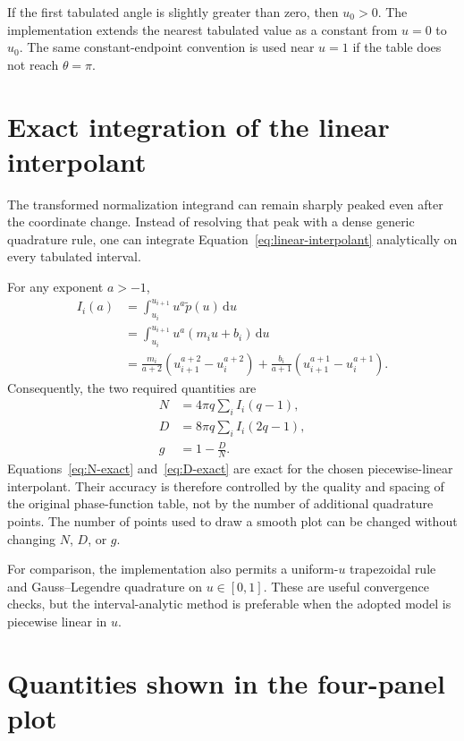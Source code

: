 \documentclass[11pt]{article}
\newcommand{\dd}{\,\mathrm{d}}
\begin{document}
If the first tabulated angle is slightly greater than zero, then $u_0>0$.
The implementation extends the nearest tabulated value as a constant from
$u=0$ to $u_0$.  The same constant-endpoint convention is used near $u=1$ if
the table does not reach $\theta=\pi$.

\section{Exact integration of the linear interpolant}

The transformed normalization integrand can remain sharply peaked even after
the coordinate change.  Instead of resolving that peak with a dense generic
quadrature rule, one can integrate Equation~\eqref{eq:linear-interpolant}
analytically on every tabulated interval.

For any exponent $a>-1$,
\begin{align}
    I_i(a)
    &=\int_{u_i}^{u_{i+1}}u^a\widetilde p(u)\dd u \\
    &=\int_{u_i}^{u_{i+1}}u^a(m_i u+b_i)\dd u \\
    &=\frac{m_i}{a+2}
      \left(u_{i+1}^{a+2}-u_i^{a+2}\right)
      +\frac{b_i}{a+1}
      \left(u_{i+1}^{a+1}-u_i^{a+1}\right).
    \label{eq:interval-integral}
\end{align}
Consequently, the two required quantities are
\begin{align}
    N
    &=4\pi q\sum_i I_i(q-1),
    \label{eq:N-exact}\\
    D
    &=8\pi q\sum_i I_i(2q-1),
    \label{eq:D-exact}\\
    g
    &=1-\frac{D}{N}.
\end{align}
Equations~\eqref{eq:N-exact} and~\eqref{eq:D-exact} are exact for the chosen
piecewise-linear interpolant.  Their accuracy is therefore controlled by the
quality and spacing of the original phase-function table, not by the number of
additional quadrature points.  The number of points used to draw a smooth plot
can be changed without changing $N$, $D$, or $g$.

For comparison, the implementation also permits a uniform-$u$ trapezoidal rule
and Gauss--Legendre quadrature on $u\in[0,1]$.  These are useful convergence
checks, but the interval-analytic method is preferable when the adopted model
is piecewise linear in $u$.

\section{Quantities shown in the four-panel plot}
\end{document}
